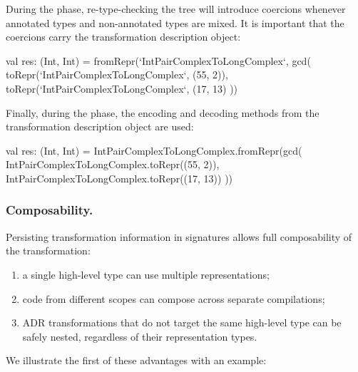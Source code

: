 During the \coerce{} phase, re-type-checking the tree will introduce coercions whenever annotated types and non-annotated types are mixed. It is important that the coercions carry the transformation description object:

\begin{lstlisting-nobreak}
val res: (Int, Int) =
  fromRepr(`IntPairComplexToLongComplex`, gcd(
    toRepr(`IntPairComplexToLongComplex`, (55, 2)),
    toRepr(`IntPairComplexToLongComplex`, (17, 13)
  ))
\end{lstlisting-nobreak}

Finally, during the \commit{} phase, the encoding and decoding methods from the transformation description object are used:

\begin{lstlisting-nobreak}
val res: (Int, Int) =
  IntPairComplexToLongComplex.fromRepr(gcd(
    IntPairComplexToLongComplex.toRepr((55, 2)),
    IntPairComplexToLongComplex.toRepr((17, 13))
  ))
\end{lstlisting-nobreak}


\subsubsection{Composability. } 
Persisting transformation information in signatures allows full composability
of the transformation:
\begin{enumerate}
  \item a single high-level type can use multiple representations;
  \item code from different scopes can compose across separate compilations;
  \item ADR transformations that do not target the same high-level type can be safely nested, regardless of their representation types.
\end{enumerate}

We illustrate the first of these advantages with an example:



